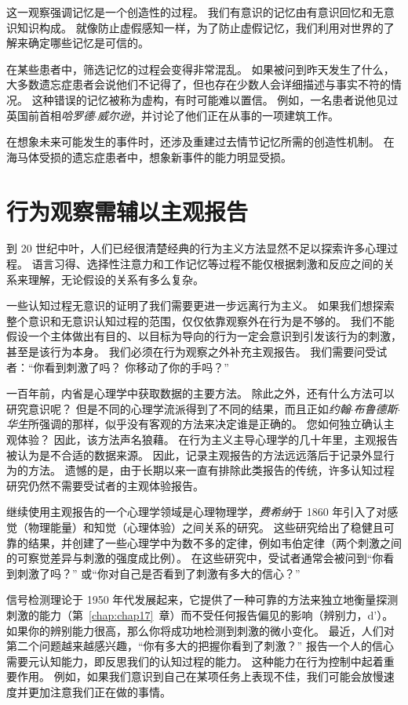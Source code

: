 这一观察强调记忆是一个创造性的过程。
我们有意识的记忆由有意识回忆和无意识知识构成。
就像防止虚假感知一样，为了防止虚假记忆，我们利用对世界的了解来确定哪些记忆是可信的。


在某些患者中，筛选记忆的过程会变得非常混乱。
如果被问到昨天发生了什么，大多数遗忘症患者会说他们不记得了，但也存在少数人会详细描述与事实不符的情况。
这种错误的记忆被称为虚构，有时可能难以置信。
例如，一名患者说他见过英国前首相\textit{哈罗德$\cdot$威尔逊}，并讨论了他们正在从事的一项建筑工作。


在想象未来可能发生的事件时，还涉及重建过去情节记忆所需的创造性机制。
在海马体受损的遗忘症患者中，想象新事件的能力明显受损。



\section{行为观察需辅以主观报告}

到 20 世纪中叶，人们已经很清楚经典的行为主义方法显然不足以探索许多心理过程。
语言习得、选择性注意力和工作记忆等过程不能仅根据刺激和反应之间的关系来理解，无论假设的关系有多么复杂。


一些认知过程无意识的证明了我们需要更进一步远离行为主义。
如果我们想探索整个意识和无意识认知过程的范围，仅仅依靠观察外在行为是不够的。
我们不能假设一个主体做出有目的、以目标为导向的行为一定会意识到引发该行为的刺激，甚至是该行为本身。
我们必须在行为观察之外补充主观报告。
我们需要问受试者：“你看到刺激了吗？
你移动了你的手吗？”


一百年前，内省是心理学中获取数据的主要方法。
除此之外，还有什么方法可以研究意识呢？
但是不同的心理学流派得到了不同的结果，而且正如\textit{约翰$\cdot$布鲁德斯$\cdot$华生}所强调的那样，似乎没有客观的方法来决定谁是正确的。
您如何独立确认主观体验？
因此，该方法声名狼藉。
在行为主义主导心理学的几十年里，主观报告被认为是不合适的数据来源。
因此，记录主观报告的方法远远落后于记录外显行为的方法。
遗憾的是，由于长期以来一直有排除此类报告的传统，许多认知过程研究仍然不需要受试者的主观体验报告。


继续使用主观报告的一个心理学领域是心理物理学，\textit{费希纳}于 1860 年引入了对感觉（物理能量）和知觉（心理体验）之间关系的研究。
这些研究给出了稳健且可靠的结果，并创建了一些心理学中为数不多的定律，例如韦伯定律（两个刺激之间的可察觉差异与刺激的强度成比例）。
在这些研究中，受试者通常会被问到“你看到刺激了吗？” 或“你对自己是否看到了刺激有多大的信心？”


信号检测理论于 1950 年代发展起来，它提供了一种可靠的方法来独立地衡量探测刺激的能力（第~\ref{chap:chap17}~章）而不受任何报告偏见的影响（辨别力，d'）。
如果你的辨别能力很高，那么你将成功地检测到刺激的微小变化。
最近，人们对第二个问题越来越感兴趣，“你有多大的把握你看到了刺激？” 
报告一个人的信心需要元认知能力，即反思我们的认知过程的能力。
这种能力在行为控制中起着重要作用。
例如，如果我们意识到自己在某项任务上表现不佳，我们可能会放慢速度并更加注意我们正在做的事情。


